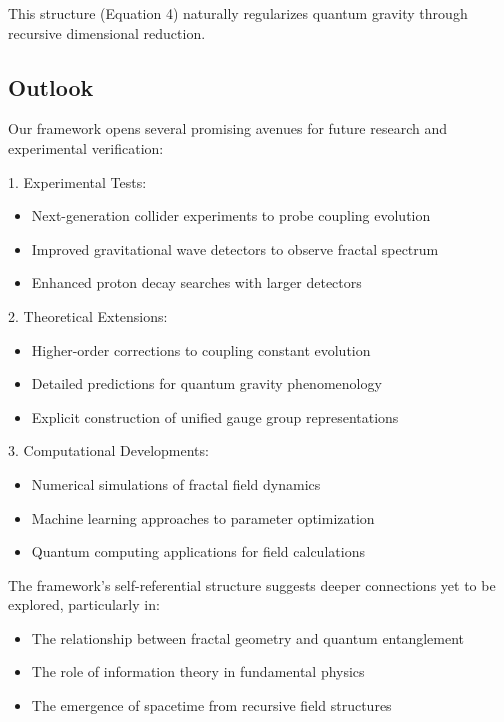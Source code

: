 \documentclass{article}
\begin{document}
This structure (Equation 4) naturally regularizes quantum gravity through recursive dimensional reduction.

\subsection{Outlook}

Our framework opens several promising avenues for future research and experimental verification:

1. Experimental Tests:
   \begin{itemize}
   \item Next-generation collider experiments to probe coupling evolution
   \item Improved gravitational wave detectors to observe fractal spectrum
   \item Enhanced proton decay searches with larger detectors
   \end{itemize}

2. Theoretical Extensions:
   \begin{itemize}
   \item Higher-order corrections to coupling constant evolution
   \item Detailed predictions for quantum gravity phenomenology
   \item Explicit construction of unified gauge group representations
   \end{itemize}

3. Computational Developments:
   \begin{itemize}
   \item Numerical simulations of fractal field dynamics
   \item Machine learning approaches to parameter optimization
   \item Quantum computing applications for field calculations
   \end{itemize}

The framework's self-referential structure suggests deeper connections yet to be explored, particularly in:

\begin{itemize}
\item The relationship between fractal geometry and quantum entanglement
\item The role of information theory in fundamental physics
\item The emergence of spacetime from recursive field structures
\end{itemize}
\end{document}

